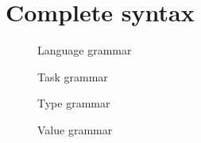 
\section{Complete syntax}

\begin{figure}[!htb]
  \small
  \caption{Language grammar} \label{fig:language-grammar}
\end{figure}

\begin{figure}[!htb]
  \small
  \caption{Task grammar} \label{fig:task-grammar}
\end{figure}

\begin{figure}[!htb]
  \small
  \caption{Type grammar} \label{fig:type-grammar}
\end{figure}

\begin{figure}[!htb]
  \small
  \caption{Value grammar} \label{fig:value-grammar}
\end{figure}
